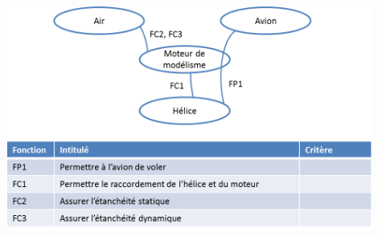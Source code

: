 \documentclass[11pt,oneside]{article}
\begin{document}
\begin{center}
\includegraphics[width=12cm]{png/af}
\end{center}
\end{document}
